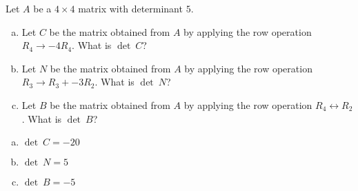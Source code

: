 
\begin{exerciseStatement}


Let \(A\) be a \(4 \times 4\) matrix with determinant \( 5 \).


\begin{enumerate}[(a)]
\item Let \(C\) be the matrix obtained from \(A\) by applying the row operation \( R_4 \to -4R_4 \). What is \(\operatorname{det}\ C\)?
\item Let \(N\) be the matrix obtained from \(A\) by applying the row operation \( R_3 \to R_3 + -3R_2 \). What is \(\operatorname{det}\ N\)?
\item Let \(B\) be the matrix obtained from \(A\) by applying the row operation \( R_4 \leftrightarrow R_2 \). What is \(\operatorname{det}\ B\)?
\end{enumerate}
    
\end{exerciseStatement}
    
\begin{exerciseAnswer} 

\begin{enumerate}[(a)]
\item \(\operatorname{det}\ C= -20 \)
\item \(\operatorname{det}\ N= 5 \)
\item \(\operatorname{det}\ B= -5 \)
\end{enumerate}
    
\end{exerciseAnswer}
    
